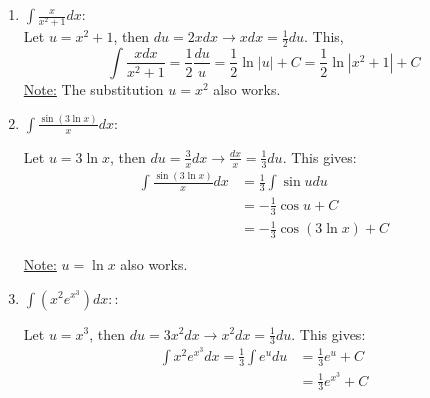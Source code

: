 \documentclass[11pt]{article}
\theoremstyle{plain}
\theoremstyle{remark}
\theoremstyle{plain}
\begin{document}
\begin{tcolorbox}[colback=magenta!5!white,colframe=magenta!75!black,title=Problem 1 ]
    \begin{enumerate} 
        \item $\int\frac{x}{x^2+1}dx$: \\
        
        Let $u=x^2+1$, then $du=2xdx\rightarrow xdx = \frac{1}{2}du$. This, \[\int\frac{xdx}{x^2+1}=\frac{1}{2}\frac{du}{u}=\frac{1}{2}\ln|u|+C = \frac{1}{2}\ln|x^2+1|+C\]
        \underline{Note:} The substitution $u=x^2$ also works.
        \item $\int\frac{\sin(3\ln x)}{x}dx$:
        
        Let $u=3\ln x$, then $du = \frac{3}{x}dx\rightarrow \frac{dx}{x}=\frac{1}{3}du$. This gives:
        \begin{align*}
            \int\frac{\sin(3\ln x)}{x}dx&=\frac{1}{3}\int\sin udu \\
            &=-\frac{1}{3}\cos u+ C\\
            &=-\frac{1}{3}\cos(3\ln x)+C
        \end{align*}

        \underline{Note:} $u=\ln x$ also works.
        \item $\int(x^2e^{x^3})dx:$:
        
        Let $u=x^3$, then $du=3x^2dx\rightarrow x^2dx=\frac{1}{3}du$. This gives:
        \begin{align*}
            \int x^2 e^{x^3}dx=\frac{1}{3}\int e^udu&=\frac{1}{3}e^u+C\\
            &=\frac{1}{3}e^{x^3}+C
        \end{align*}
    \end{enumerate}
\end{tcolorbox}   
\end{document}
